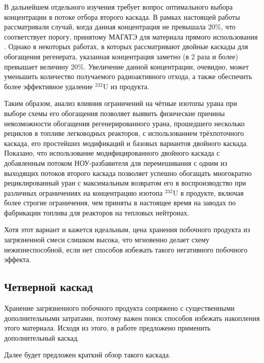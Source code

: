В дальнейшем отдельного изучения требует вопрос оптимального выбора концентрации в потоке отбора второго каскада. В рамках настоящей работы рассматривали случай, когда данная концентрация не превышала 20\%, что соответствует порогу, принятому МАГАТЭ для материала прямого использования \cite{alekseevConceptUseRecycled2010}. Однако в некоторых работах, в которых рассматривают двойные каскады для обогащения регенерата, указанная концентрация заметно (в 2 раза и более) превышает величину 20\%. Увеличение данной концентрации, очевидно, может уменьшить количество получаемого радиоактивного отхода, а также обеспечить более эффективное удаление $^{232}$U из продукта.

Таким образом, анализ влияния ограничений на чётные изотопы урана при выборе схемы его обогащения позволяет выявить физические причины невозможности обогащения регенерированного урана, прошедшего несколько рециклов в топливе легководных реакторов, с использованием трёхпоточного каскада, его простейших модификаций и базовых вариантов двойного каскада. 
Показано, что использование модифицированного двойного каскада с добавленным потоком НОУ-разбавителя для перемешивания с одним из выходящих потоков второго каскада позволяет успешно обогащать многократно рециклированный уран с максимальным возвратом его в воспроизводство при различных ограничениях на концентрацию изотопа $^{232}$U в продукте, включая более строгие ограничения, чем приняты в настоящее время на заводах по фабрикации топлива для реакторов на тепловых нейтронах.


Хотя этот вариант и кажется идеальным, цена хранения побочного продукта из загрязненной смеси слишком высока, что мгновенно делает схему нежизнеспособной, если нет способов избежать такого негативного побочного эффекта.




\subsection{Четверной каскад}
Хранение загрязненного побочного продукта сопряжено с существенными дополнительными затратами, поэтому важен поиск способов избежать накопления этого материала.
Исходя из этого, в работе \cite{smirnovMethodEnrichReprocessed2019} предложено применить дополнительный каскад.

Далее будет предложен краткий обзор такого каскада.
 
